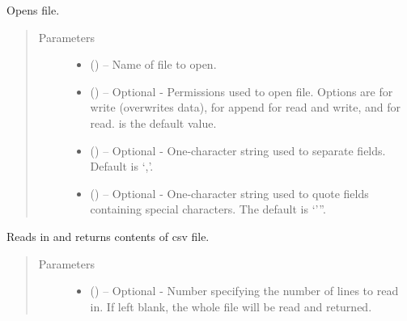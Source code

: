 \documentclass[a4paper,10pt,openany,english]{sphinxmanual}
\begin{document}
\begin{fulllineitems}
\begin{fulllineitems}
\end{fulllineitems}


\begin{fulllineitems}
\label{egadsapi:egads.input.text_file_io.EgadsCsv.open}
Opens file.
\begin{quote}\begin{description}
\item[{Parameters}] \leavevmode\begin{itemize}
\item {} 
 () -- Name of file to open.

\item {} 
 () -- Optional - Permissions used to open file. Options are  for write (overwrites
data),  for append  for read and write, and  for read.  is 
the default value.

\item {} 
 () -- Optional - One-character string used to separate fields. Default is `,'.

\item {} 
 () -- Optional - One-character string used to quote fields containing special characters.
The default is `'''.

\end{itemize}

\end{description}\end{quote}

\end{fulllineitems}


\begin{fulllineitems}
\label{egadsapi:egads.input.text_file_io.EgadsCsv.read}
Reads in and returns contents of csv file.
\begin{quote}\begin{description}
\item[{Parameters}] \leavevmode\begin{itemize}
\item {} 
 () -- Optional - Number specifying the number of lines to read in. If left blank,
the whole file will be read and returned.


\end{itemize}
\end{description}
\end{quote}
\end{fulllineitems}
\end{fulllineitems}
\end{document}
